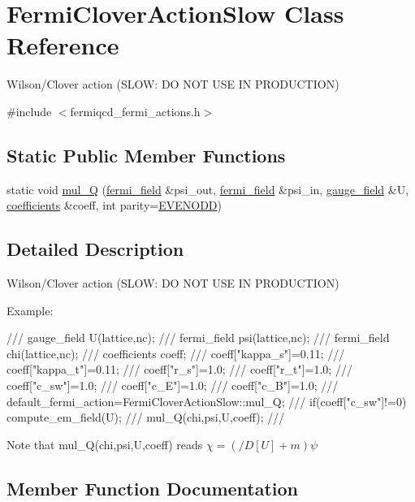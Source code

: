 \hypertarget{class_fermi_clover_action_slow}{}\section{Fermi\+Clover\+Action\+Slow Class Reference}
\label{class_fermi_clover_action_slow}


Wilson/\+Clover action (S\+L\+OW\+: DO N\+OT U\+SE IN P\+R\+O\+D\+U\+C\+T\+I\+ON)  




{\ttfamily \#include $<$fermiqcd\+\_\+fermi\+\_\+actions.\+h$>$}

\subsection*{Static Public Member Functions}
\begin{DoxyCompactItemize}
\item 
static void \hyperlink{class_fermi_clover_action_slow_a8e9b281981e3907873fc08c52f2c3d21}{mul\+\_\+Q} (\hyperlink{classfermi__field}{fermi\+\_\+field} \&psi\+\_\+out, \hyperlink{classfermi__field}{fermi\+\_\+field} \&psi\+\_\+in, \hyperlink{classgauge__field}{gauge\+\_\+field} \&U, \hyperlink{classcoefficients}{coefficients} \&coeff, int parity=\hyperlink{mdp__global__vars_8h_a4c9de81f2de5a74b588107b6c0afb9ee}{E\+V\+E\+N\+O\+DD})
\end{DoxyCompactItemize}


\subsection{Detailed Description}
Wilson/\+Clover action (S\+L\+OW\+: DO N\+OT U\+SE IN P\+R\+O\+D\+U\+C\+T\+I\+ON) 

Example\+: \begin{DoxyVerb}/// gauge_field U(lattice,nc);
/// fermi_field psi(lattice,nc);
/// fermi_field chi(lattice,nc);
/// coefficients coeff;
/// coeff["kappa_s"]=0.11;
/// coeff["kappa_t"]=0.11;
/// coeff["r_s"]=1.0;
/// coeff["r_t"]=1.0;
/// coeff["c_{sw}"]=1.0;
/// coeff["c_E"]=1.0;
/// coeff["c_B"]=1.0;
/// default_fermi_action=FermiCloverActionSlow::mul_Q;
/// if(coeff["c_{sw}"]!=0) compute_em_field(U);
/// mul_Q(chi,psi,U,coeff);
/// \end{DoxyVerb}
 Note that mul\+\_\+\+Q(chi,psi,\+U,coeff) reads $ \chi=(/\!\!\!D[U]+m)\psi $ 

\subsection{Member Function Documentation}
\mbox{\label{class_fermi_clover_action_slow_a8e9b281981e3907873fc08c52f2c3d21}} 
